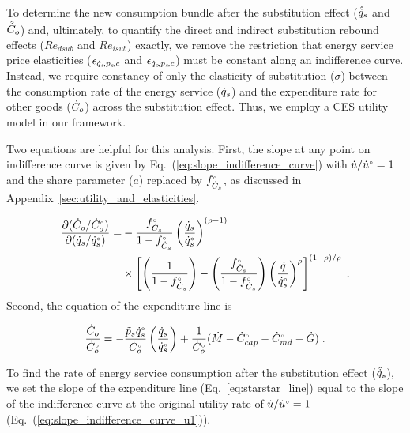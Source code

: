 To determine the new consumption bundle after the substitution effect 
($\hat{\dot{q}}_s$ and $\hat{\dot{C}}_o$)
and,
ultimately, to quantify the direct and indirect substitution rebound effects
($Re_{dsub}$ and $Re_{isub}$) exactly,
we remove the restriction that energy service price elasticities ($\epsilon_{\dot{q}_s\!,p_s\!,c}$ and $\epsilon_{\dot{q}_o\!,p_s\!,c}$)
must be constant along an indifference curve.
Instead, we require constancy of only
the elasticity of substitution ($\sigma$) between
the consumption rate of the energy service ($\dot{q}_s$)
and the expenditure rate for other goods ($\dot{C}_o$)
across the substitution effect.
Thus, we employ a CES utility model in our framework.

Two equations are helpful for this analysis.
First, the slope at any point on indifference curve %
is given by Eq.~(\ref{eq:slope_indifference_curve}) with 
$\dot{u}/{}{\dot{u}}^{\scriptscriptstyle \circ} = 1$ and 
the share parameter ($a$) replaced by ${}{f}^{\scriptscriptstyle \circ}_{\dot{C}_s}$,
as discussed in Appendix~\ref{sec:utility_and_elasticities}.

\begin{align} \label{eq:slope_indifference_curve_u1}
  \frac{\partial (\dot{C}_o/{}{\dot{C}}^{\scriptscriptstyle \circ}_o)}{\partial (\dot{q}_s/{}{\dot{q}}^{\scriptscriptstyle \circ}_s)} =&
        -\frac{{}{f}^{\scriptscriptstyle \circ}_{\dot{C}_s}}{1 - {}{f}^{\scriptscriptstyle \circ}_{\dot{C}_s}} \left( \frac{\dot{q}_s}{{}{\dot{q}}^{\scriptscriptstyle \circ}_s} \right)^{(\rho -1)} \nonumber  \\
        &\times \left[ \left( \frac{1}{1 - {}{f}^{\scriptscriptstyle \circ}_{\dot{C}_s}} \right) 
                - \left( \frac{{}{f}^{\scriptscriptstyle \circ}_{\dot{C}_s}}{1 - {}{f}^{\scriptscriptstyle \circ}_{\dot{C}_s}} \right) 
                          \left( \frac{\dot{q}}{{}{\dot{q}}^{\scriptscriptstyle \circ}_s} \right)^\rho \right]^{(1 - \rho)/\rho} \; .
\end{align}
%
Second, the equation of the %
expenditure line is

\begin{equation} \label{eq:starstar_line}
  \frac{\dot{C}_o}{{}{\dot{C}}^{\scriptscriptstyle \circ}_o} = 
      -\frac{\tilde{p}_s {}{\dot{q}}^{\scriptscriptstyle \circ}_s}
            {{}{\dot{C}}^{\scriptscriptstyle \circ}_o}
        \left(  \frac{\dot{q}_s}{{}{\dot{q}}^{\scriptscriptstyle \circ}_s} \right)
      + \frac{1}{{}{\dot{C}}^{\scriptscriptstyle \circ}_o} 
        (\dot{M} - {}{\dot{C}}^{\scriptscriptstyle \circ}_{cap} - {}{\dot{C}}^{\scriptscriptstyle \circ}_{md} - \dot{G}) \; .
\end{equation}

To find the rate of energy service consumption after the substitution effect
($\hat{\dot{q}}_s$), we set the slope of the %
expenditure line (Eq.~\ref{eq:starstar_line})
equal to the slope of the %
indifference curve 
at the original utility rate of $\dot{u}/{}{\dot{u}}^{\scriptscriptstyle \circ} = 1$ (Eq.~(\ref{eq:slope_indifference_curve_u1})).

